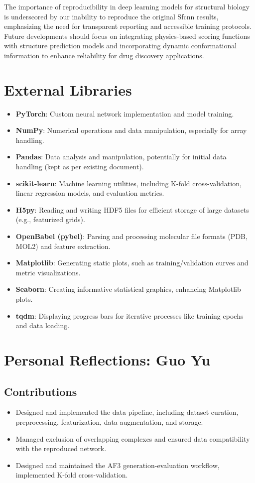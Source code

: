 \documentclass[unnumsec,webpdf,contemporary,large]{oup-authoring-template}
\theoremstyle{thmstyleone}%
\theoremstyle{thmstyletwo}%
\theoremstyle{thmstylethree}%
\begin{document}
The importance of reproducibility in deep learning models for structural biology is underscored 
by our inability to reproduce the original Sfcnn results, emphasizing the need for transparent 
reporting and accessible training protocols. Future developments should focus on integrating 
physics-based scoring functions with structure prediction models and incorporating dynamic 
conformational information to enhance reliability for drug discovery applications.


\section{External Libraries}

\begin{itemize}
    \item \textbf{PyTorch}: Custom neural network implementation and model training.
    \item \textbf{NumPy}: Numerical operations and data manipulation, especially for array handling.
    \item \textbf{Pandas}: Data analysis and manipulation, potentially for initial data handling (kept as per existing document).
    \item \textbf{scikit-learn}: Machine learning utilities, including K-fold cross-validation, linear regression models, and evaluation metrics.
    \item \textbf{H5py}: Reading and writing HDF5 files for efficient storage of large datasets (e.g., featurized grids).
    \item \textbf{OpenBabel (pybel)}: Parsing and processing molecular file formats (PDB, MOL2) and feature extraction.
    \item \textbf{Matplotlib}: Generating static plots, such as training/validation curves and metric visualizations.
    \item \textbf{Seaborn}: Creating informative statistical graphics, enhancing Matplotlib plots.
    \item \textbf{tqdm}: Displaying progress bars for iterative processes like training epochs and data loading.
\end{itemize}

\section{Personal Reflections: Guo Yu}

\subsection{Contributions}
\begin{itemize}
    \item Designed and implemented the data pipeline, including dataset curation, preprocessing, featurization, data augmentation, and storage.
    \item Managed exclusion of overlapping complexes and ensured data compatibility with the reproduced network.
    \item Designed and maintained the AF3 generation-evaluation workflow, implemented K-fold cross-validation.
\end{itemize}
\end{document}
